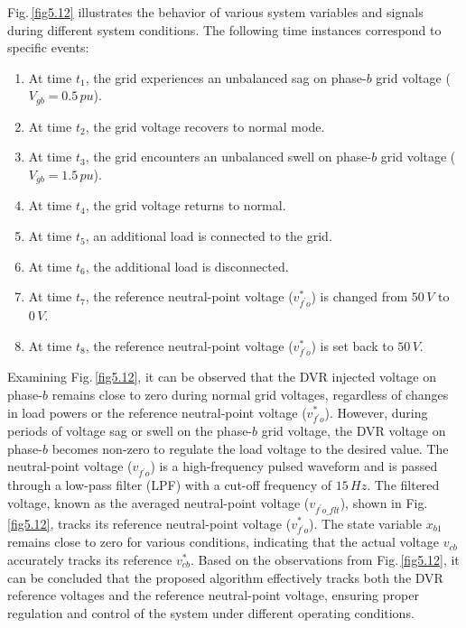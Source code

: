 Fig.\,\ref{fig5.12} illustrates the behavior of various system variables and signals during different system conditions. The following time instances correspond to specific events:
\begin{enumerate}
	\item At time $t_1$, the grid experiences an unbalanced sag on phase-$b$ grid voltage ($V_{gb}=0.5\,\si{pu}$). \vspace*{-0.5cm}
	\item At time $t_2$, the grid voltage recovers to normal mode. \vspace*{-0.5cm}
	\item At time $t_3$, the grid encounters an unbalanced swell on phase-$b$ grid voltage ($V_{gb}=1.5\,\si{pu}$). \vspace*{-0.5cm}
	\item At time $t_4$, the grid voltage returns to normal. \vspace*{-0.5cm}
	\item At time $t_5$, an additional load is connected to the grid. \vspace*{-0.5cm}
	\item At time $t_6$, the additional load is disconnected. \vspace*{-0.5cm}
	\item At time $t_7$, the reference neutral-point voltage ($v^{*}_{f^{\prime}o}$) is changed from $50\,\si{V}$ to $0\,\si{V}$. \vspace*{-1.3cm}
	\item At time $t_8$, the reference neutral-point voltage ($v^{*}_{f^{\prime}o}$) is set back to $50\,\si{V}$. \vspace*{-0.5cm}
\end{enumerate}
Examining Fig.\,\ref{fig5.12}, it can be observed that the DVR injected voltage on phase-$b$ remains close to zero during normal grid voltages, regardless of changes in load powers or the reference neutral-point voltage ($v^{*}_{f^{\prime}o}$). However, during periods of voltage sag or swell on the phase-$b$ grid voltage, the DVR voltage on phase-$b$ becomes non-zero to regulate the load voltage to the desired value.
The neutral-point voltage ($v_{f^{\prime}o}$) is a high-frequency pulsed waveform and is passed through a low-pass filter (LPF) with a cut-off frequency of $15\,\si{Hz}$. The filtered voltage, known as the averaged neutral-point voltage ($v_{f^{\prime}o\_flt}$), shown in Fig.\,\ref{fig5.12}, tracks its reference neutral-point voltage ($v^{*}_{f^{\prime}o}$).
The state variable $x_{b1}$ remains close to zero for various conditions, indicating that the actual voltage $v_{cb}$ accurately tracks its reference $v^{*}_{cb}$.
Based on the observations from Fig.\,\ref{fig5.12}, it can be concluded that the proposed algorithm effectively tracks both the DVR reference voltages and the reference neutral-point voltage, ensuring proper regulation and control of the system under different operating conditions.

